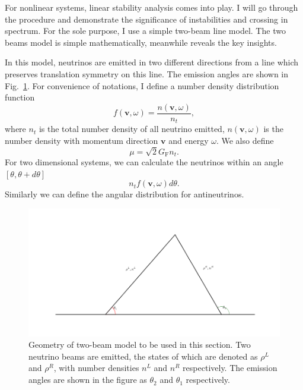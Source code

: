 For nonlinear systems, linear stability analysis comes into play. I will go through the procedure and demonstrate the significance of instabilities and crossing in spectrum. For the sole purpose, I use a simple two-beam line model. The two beams model is simple mathematically, meanwhile reveals the key insights.

In this model, neutrinos are emitted in two different directions from a line which preserves translation symmetry on this line. The emission angles are shown in Fig.~\ref{chap:collective-sec:two-beams-fig:two-beam-line-model}. For convenience of notations, I define a number density distribution function
\begin{equation}
   f(\mathbf v,\omega)= \frac{n(\mathbf v,\omega)}{n_t},
\end{equation}
where $n_t$ is the total number density of all neutrino emitted, $n(\mathbf v,\omega)$ is the number density with momentum direction $\mathbf v$ and energy $\omega$.
We also define
\begin{equation}
   \mu = \sqrt{2}G_{\mathrm F} n_t.
\end{equation}
For two dimensional systems, we can calculate the neutrinos within an angle $[\theta,\theta+d\theta]$
\begin{equation}
   n_t f(\mathbf v,\omega) d\theta.
\end{equation}
Similarly we can define the angular distribution for antineutrinos.


\begin{figure}[!htbp]
    \centering
    \includegraphics[width=\textwidth]{chapters/assets/dr/two-beam-line-model.png}
    \caption{Geometry of two-beam model to be used in this section. Two neutrino beams are emitted, the states of which are denoted as $\rho^L$ and $\rho^R$, with number densities $n^L$ and $n^R$ respectively. The emission angles are shown in the figure as $\theta_2$ and $\theta_1$ respectively. }
    \label{chap:collective-sec:two-beams-fig:two-beam-line-model}
\end{figure}



